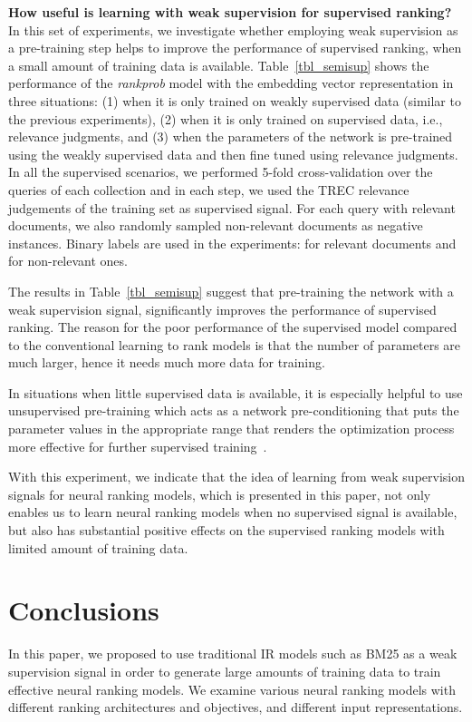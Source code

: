 \documentclass[sigconf]{acmart}
\newcommand{\modelthree}{\textit{rank\-prob} model\xspace}
\newcommand{\feedthree}{embedding vector representation\xspace}
\newcommand{\shrink}{\vspace{-1.5ex}}
\def\:{\hskip0pt} \newcommand{\mypar}[1]{\vspace*{-0.1ex}\medskip\noindent\textbf{#1}~}
\begin{document}
\mypar{How useful is learning with weak supervision for supervised ranking?}
In this set of experiments, we investigate whether employing weak supervision as a pre-training step helps to improve the performance of supervised ranking, when a small amount of training data is available. Table~\ref{tbl_semisup} shows the performance of the \modelthree with the \feedthree in three situations: (1) when it is only trained on weakly supervised data (similar to the previous experiments), (2) when it is only trained on supervised data, i.e., relevance judgments, and (3) when the parameters of the network is pre-trained using the weakly supervised data and then fine tuned using relevance judgments.
In all the supervised scenarios, we performed 5-fold cross-\:validation over the queries of each collection and in each step, we used the TREC relevance judgements of the training set as supervised signal. For each query with  relevant documents, we also randomly sampled  non-relevant documents as negative instances. Binary labels are used in the experiments:  for relevant documents and  for non-relevant ones.

The results in Table~\ref{tbl_semisup} suggest that pre-training the network with a weak supervision signal, significantly improves the performance of supervised ranking.
The reason for the poor performance of the supervised model compared to the conventional learning to rank models is that the number of parameters are much larger, hence it needs much more data for training.

In situations when little supervised data is available, it is especially helpful to use unsupervised pre-training which acts as a network pre-conditioning that puts the parameter values in the appropriate range that renders the optimization process more effective for further supervised training~\citep{Rrhan:2010}.

With this experiment, we indicate that the idea of learning from weak supervision signals for neural ranking models, which is presented in this paper, not only enables us to learn neural ranking models when no supervised signal is available, but also has substantial positive effects on the supervised ranking models with limited amount of training data. 

\shrink
\section{Conclusions}
In this paper, we proposed to use traditional IR models such as BM25 as a weak supervision signal in order to generate large amounts of training data to train effective neural ranking models.  
We examine various neural ranking models with different ranking architectures and objectives, and different input representations. 
\end{document}
